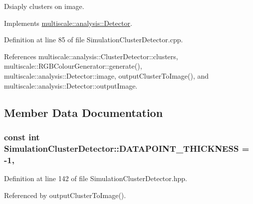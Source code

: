 Dsiaply clusters on image. 



Implements \hyperlink{classmultiscale_1_1analysis_1_1Detector_a5d10b68605d5a1711527b4b896b3b2cc}{multiscale\-::analysis\-::\-Detector}.



Definition at line 85 of file Simulation\-Cluster\-Detector.\-cpp.



References multiscale\-::analysis\-::\-Cluster\-Detector\-::clusters, multiscale\-::\-R\-G\-B\-Colour\-Generator\-::generate(), multiscale\-::analysis\-::\-Detector\-::image, output\-Cluster\-To\-Image(), and multiscale\-::analysis\-::\-Detector\-::output\-Image.



\subsection{Member Data Documentation}
\hypertarget{classmultiscale_1_1analysis_1_1SimulationClusterDetector_a530922a3fad1e612062d17d07e2dc763}{
\subsubsection[{D\-A\-T\-A\-P\-O\-I\-N\-T\-\_\-\-T\-H\-I\-C\-K\-N\-E\-S\-S}]{\setlength{\rightskip}{0pt plus 5cm}const int Simulation\-Cluster\-Detector\-::\-D\-A\-T\-A\-P\-O\-I\-N\-T\-\_\-\-T\-H\-I\-C\-K\-N\-E\-S\-S = -\/1\hspace{0.3cm}{\ttfamily [static]}, {\ttfamily [private]}}}\label{classmultiscale_1_1analysis_1_1SimulationClusterDetector_a530922a3fad1e612062d17d07e2dc763}


Definition at line 142 of file Simulation\-Cluster\-Detector.\-hpp.



Referenced by output\-Cluster\-To\-Image().

